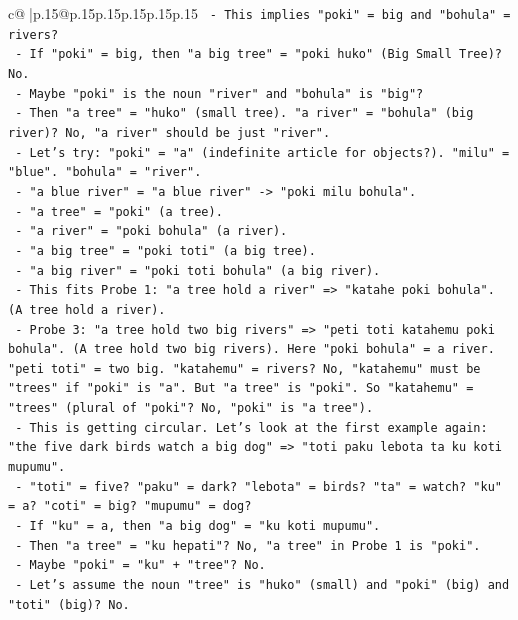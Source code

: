 \documentclass{article}
\begin{document}
{\begin{supertabular}{c@{$\;$}|p{.15\linewidth}@{}p{.15\linewidth}p{.15\linewidth}p{.15\linewidth}p{.15\linewidth}p{.15\linewidth}}
{{{\texttt{          {-} This implies "poki" = big and "bohula" = rivers?} \\
\texttt{          {-} If "poki" = big, then "a big tree" = "poki huko" (Big Small Tree)? No.} \\
\texttt{          {-} Maybe "poki" is the noun "river" and "bohula" is "big"?} \\
\texttt{          {-} Then "a tree" = "huko" (small tree). "a river" = "bohula" (big river)? No, "a river" should be just "river".} \\
\texttt{          {-} Let's try: "poki" = "a" (indefinite article for objects?). "milu" = "blue". "bohula" = "river".} \\
\texttt{          {-} "a blue river" = "a blue river" {-}> "poki milu bohula".} \\
\texttt{          {-} "a tree" = "poki" (a tree).} \\
\texttt{          {-} "a river" = "poki bohula" (a river).} \\
\texttt{          {-} "a big tree" = "poki toti" (a big tree).} \\
\texttt{          {-} "a big river" = "poki toti bohula" (a big river).} \\
\texttt{          {-} This fits Probe 1: "a tree hold a river" => "katahe poki bohula". (A tree hold a river).} \\
\texttt{          {-} Probe 3: "a tree hold two big rivers" => "peti toti katahemu poki bohula". (A tree hold two big rivers). Here "poki bohula" = a river. "peti toti" = two big. "katahemu" = rivers? No, "katahemu" must be "trees" if "poki" is "a". But "a tree" is "poki". So "katahemu" = "trees" (plural of "poki"? No, "poki" is "a tree").} \\
\texttt{          {-} This is getting circular. Let's look at the first example again: "the five dark birds watch a big dog" => "toti paku lebota ta ku koti mupumu".} \\
\texttt{            {-} "toti" = five? "paku" = dark? "lebota" = birds? "ta" = watch? "ku" = a? "coti" = big? "mupumu" = dog?} \\
\texttt{            {-} If "ku" = a, then "a big dog" = "ku koti mupumu".} \\
\texttt{            {-} Then "a tree" = "ku hepati"? No, "a tree" in Probe 1 is "poki".} \\
\texttt{            {-} Maybe "poki" = "ku" + "tree"? No.} \\
\texttt{            {-} Let's assume the noun "tree" is "huko" (small) and "poki" (big) and "toti" (big)? No.} \\
}}}
\end{supertabular}}
\end{document}
